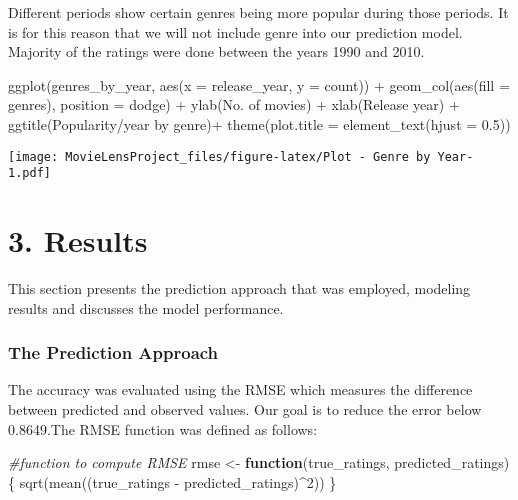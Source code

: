 \documentclass[
]{article}
\newenvironment{Shaded}{\begin{snugshade}}{\end{snugshade}}
\newcommand{\AttributeTok}[1]{\textcolor[rgb]{0.77,0.63,0.00}{#1}}
\newcommand{\CommentTok}[1]{\textcolor[rgb]{0.56,0.35,0.01}{\textit{#1}}}
\newcommand{\ControlFlowTok}[1]{\textcolor[rgb]{0.13,0.29,0.53}{\textbf{#1}}}
\newcommand{\DecValTok}[1]{\textcolor[rgb]{0.00,0.00,0.81}{#1}}
\newcommand{\FloatTok}[1]{\textcolor[rgb]{0.00,0.00,0.81}{#1}}
\newcommand{\FunctionTok}[1]{\textcolor[rgb]{0.00,0.00,0.00}{#1}}
\newcommand{\NormalTok}[1]{#1}
\newcommand{\OtherTok}[1]{\textcolor[rgb]{0.56,0.35,0.01}{#1}}
\newcommand{\SpecialCharTok}[1]{\textcolor[rgb]{0.00,0.00,0.00}{#1}}
\newcommand{\StringTok}[1]{\textcolor[rgb]{0.31,0.60,0.02}{#1}}
\begin{document}
Different periods show certain genres being more popular during those
periods. It is for this reason that we will not include genre into our
prediction model. Majority of the ratings were done between the years
1990 and 2010.

\begin{Shaded}
\begin{Highlighting}[]
\FunctionTok{ggplot}\NormalTok{(genres\_by\_year, }\FunctionTok{aes}\NormalTok{(}\AttributeTok{x =}\NormalTok{ release\_year, }\AttributeTok{y =}\NormalTok{ count)) }\SpecialCharTok{+} 
  \FunctionTok{geom\_col}\NormalTok{(}\FunctionTok{aes}\NormalTok{(}\AttributeTok{fill =}\NormalTok{ genres), }\AttributeTok{position =} \StringTok{\textquotesingle{}dodge\textquotesingle{}}\NormalTok{) }\SpecialCharTok{+} 
  \FunctionTok{ylab}\NormalTok{(}\StringTok{\textquotesingle{}No. of movies\textquotesingle{}}\NormalTok{) }\SpecialCharTok{+} 
  \FunctionTok{xlab}\NormalTok{(}\StringTok{\textquotesingle{}Release year\textquotesingle{}}\NormalTok{) }\SpecialCharTok{+} 
  \FunctionTok{ggtitle}\NormalTok{(}\StringTok{\textquotesingle{}Popularity/year by genre\textquotesingle{}}\NormalTok{)}\SpecialCharTok{+}
  \FunctionTok{theme}\NormalTok{(}\AttributeTok{plot.title =} \FunctionTok{element\_text}\NormalTok{(}\AttributeTok{hjust =} \FloatTok{0.5}\NormalTok{))}
\end{Highlighting}
\end{Shaded}

\texttt{[image: MovieLensProject\_files/figure-latex/Plot - Genre by Year-1.pdf]}

\hypertarget{results}{%
\section{3. Results}\label{results}}

This section presents the prediction approach that was employed,
modeling results and discusses the model performance.

\hypertarget{the-prediction-approach}{%
\subsubsection{The Prediction Approach}\label{the-prediction-approach}}

The accuracy was evaluated using the RMSE which measures the difference
between predicted and observed values. Our goal is to reduce the error
below 0.8649.The RMSE function was defined as follows:

\begin{Shaded}
\begin{Highlighting}[]
\CommentTok{\#function to compute RMSE}
\NormalTok{rmse }\OtherTok{\textless{}{-}} \ControlFlowTok{function}\NormalTok{(true\_ratings, predicted\_ratings)\{}
  \FunctionTok{sqrt}\NormalTok{(}\FunctionTok{mean}\NormalTok{((true\_ratings }\SpecialCharTok{{-}}\NormalTok{ predicted\_ratings)}\SpecialCharTok{\^{}}\DecValTok{2}\NormalTok{))}
\NormalTok{\}}
\end{Highlighting}
\end{Shaded}
\end{document}

